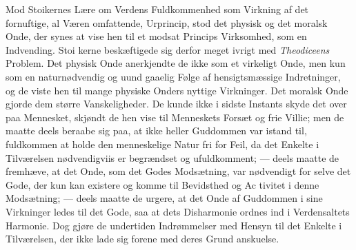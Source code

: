 \documentclass[12pt,a4paper]{book}
\newcommand{\gk}[1]{\textit{#1}}
\begin{document}
Mod Stoikernes Lære om Verdens Fuldkommenhed som
Virkning af det fornuftige, al Væren omfattende, Urprincip,
stod det physisk og det moralsk Onde, der synes at vise hen
til et modsat Princips Virksomhed, som en Indvending. Stoi\-%
kerne beskæftigede sig derfor meget ivrigt med \emph{Theodiceens}
Problem. Det physisk Onde anerkjendte de ikke som et
virkeligt Onde, men kun som en naturnødvendig og uund\-%
gaaelig Følge af hensigtsmæssige Indretninger, og de viste hen
til mange physiske Onders nyttige Virkninger. Det moralsk
Onde gjorde dem større Vanskeligheder. De kunde ikke i
sidste Instants skyde det over paa Mennesket, skjøndt de hen\-%
vise til Menneskets Forsæt og frie Villie; men de maatte deels
beraabe sig paa, at ikke heller Guddommen var istand til,
fuldkommen at holde den menneskelige Natur fri for Feil,
da det Enkelte i Tilværelsen nødvendigviis er begrændset og
ufuldkomment; --- deels maatte de fremhæve, at det Onde,
som det Godes Modsætning, var nødvendigt for selve det
Gode, der kun kan existere og komme til Bevidsthed og Ac\-%
tivitet i denne Modsætning; --- deels maatte de urgere, at det
Onde af Guddommen i sine Virkninger ledes til det Gode, saa
at dets Disharmonie ordnes ind i Verdensaltets Harmonie. Dog
gjøre de undertiden Indrømmelser med Hensyn til det Enkelte
i Tilværelsen, der ikke lade sig forene med deres Grund\-%
anskuelse.
\end{document}

